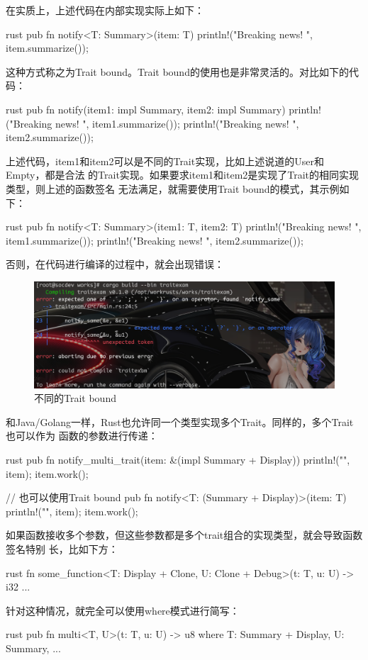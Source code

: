 在实质上，上述代码在内部实现实际上如下：
\begin{code-block}{rust}
pub fn notify<T: Summary>(item: T) {
    println!("Breaking news! {}", item.summarize());
}
\end{code-block}
这种方式称之为Trait bound。Trait bound的使用也是非常灵活的。对比如下的代码：
\begin{code-block}{rust}
pub fn notify(item1: impl Summary, item2: impl Summary) {
    println!("Breaking news! {}", item1.summarize());
    println!("Breaking news! {}", item2.summarize());
}
\end{code-block}
上述代码，item1和item2可以是不同的Trait实现，比如上述说道的User和Empty，都是合法
的Trait实现。如果要求item1和item2是实现了Trait的相同实现类型，则上述的函数签名
无法满足，就需要使用Trait bound的模式，其示例如下：
\begin{code-block}{rust}
pub fn notify<T: Summary>(item1: T, item2: T) {
    println!("Breaking news! {}", item1.summarize());
    println!("Breaking news! {}", item2.summarize());
}
\end{code-block}
否则，在代码进行编译的过程中，就会出现错误：
\begin{figure}[H]
  \centering
  \includegraphics[scale=0.4]{rust_trait_bound.png}
  \caption{不同的Trait bound}
  \label{fig:rust_trait_bound}
\end{figure}

和Java/Golang一样，Rust也允许同一个类型实现多个Trait。同样的，多个Trait也可以作为
函数的参数进行传递：
\begin{code-block}{rust}
pub fn notify_multi_trait(item: &(impl Summary + Display)) {
    println!("{}", item);
    item.work();
}

// 也可以使用Trait bound
pub fn notify<T: (Summary + Display)>(item: T) {
    println!("{}", item);
    item.work();
}
\end{code-block}

如果函数接收多个参数，但这些参数都是多个trait组合的实现类型，就会导致函数签名特别
长，比如下方：
\begin{code-block}{rust}
fn some_function<T: Display + Clone, U: Clone + Debug>(t: T, u: U) -> i32 {
    ...
}
\end{code-block}
针对这种情况，就完全可以使用where模式进行简写：
\begin{code-block}{rust}
pub fn multi<T, U>(t: T, u: U) -> u8
where
    T: Summary + Display,
    U: Summary,
{
    ...
}
\end{code-block}

